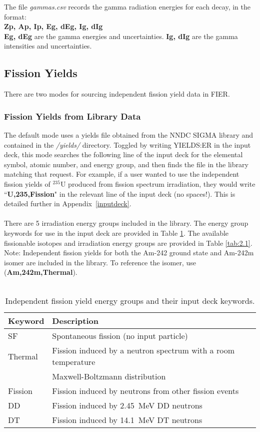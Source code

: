 \documentclass{article}
\begin{document}
\begin{appendices}
\noindent The file \textit{gammas.csv} records the gamma radiation energies for each decay, in the format:\\
\textbf{Zp, Ap, Ip, Eg, dEg, Ig, dIg}\\
\textbf{Eg, dEg} are the gamma energies and uncertainties. \textbf{Ig, dIg} are the gamma intensities and uncertainties.
\\
\subsection{Fission Yields}\label{Yields}
There are two modes for sourcing independent fission yield data in FIER. 
\subsubsection{Fission Yields from Library Data}
The default mode uses a yields file obtained from the NNDC SIGMA library \cite{SIGMA} and contained in the \textit{/yields/} directory. Toggled by writing YIELDS:ER in the input deck, this mode searches the following line of the input deck for the elemental symbol, atomic number, and energy group, and then finds the file in the library matching that request. For example, if a user wanted to use the independent fission yields of $^{235}$U produced from fission spectrum irradiation, they would write ``\textbf{U,235,Fission}" in the relevant line of the input deck (no spaces!). This is detailed further in Appendix~\ref{inputdeck}.
\\\\
\noindent There are 5 irradiation energy groups included in the library. The energy group keywords for use in the input deck are provided in Table \ref{tab:2}. The available fissionable isotopes and irradiation energy groups are provided in Table \ref{tab:2.1}. Note: Independent fission yields for both the Am-242 ground state and Am-242m isomer are included in the library. To reference the isomer, use (\textbf{Am,242m,Thermal}).
\\
\\
\begin{table}
\centering
\begin{tabular}{ll}
\hline
Keyword & Description \\ 
\hline
 SF & Spontaneous fission (no input particle)\\
 Thermal & Fission induced by a neutron spectrum with a room temperature\\ &Maxwell-Boltzmann distribution \\ 
 Fission & Fission induced by neutrons from other fission events\\ 
 DD & Fission induced by 2.45~MeV DD neutrons \\
 DT & Fission induced by 14.1~MeV DT neutrons \\
 \hline
\end{tabular}
\caption{Independent fission yield energy groups and their input deck keywords.}
\label{tab:2}
\end{table}


\end{appendices}
\end{document}
